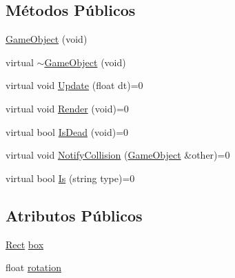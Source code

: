 \subsection*{Métodos Públicos}
\begin{DoxyCompactItemize}
\item 
\hyperlink{classGameObject_a78da814b13c8bf344ba0c5f72cb22af3}{Game\+Object} (void)
\item 
virtual \hyperlink{classGameObject_a3b086987a48c14ebe80939bd66d5f1c8}{$\sim$\+Game\+Object} (void)
\item 
virtual void \hyperlink{classGameObject_a93ed63df640deb516a020530e7f8e045}{Update} (float dt)=0
\item 
virtual void \hyperlink{classGameObject_a976b9c0d72212389603802f95b3f3424}{Render} (void)=0
\item 
virtual bool \hyperlink{classGameObject_a076afa2ea9190c49046f86a0946b4543}{Is\+Dead} (void)=0
\item 
virtual void \hyperlink{classGameObject_aa627e6c2913983fc5f108c1c4d303eb8}{Notify\+Collision} (\hyperlink{classGameObject}{Game\+Object} \&other)=0
\item 
virtual bool \hyperlink{classGameObject_a3ddba599a800d774463c7082b7ef4801}{Is} (string type)=0
\end{DoxyCompactItemize}
\subsection*{Atributos Públicos}
\begin{DoxyCompactItemize}
\item 
\hyperlink{classRect}{Rect} \hyperlink{classGameObject_ac8df90f2a6d41693cd7938e392ff6d0b}{box}
\item 
float \hyperlink{classGameObject_ac55f6ebdf4cfbab508680ad7290fb26c}{rotation}
\end{DoxyCompactItemize}


